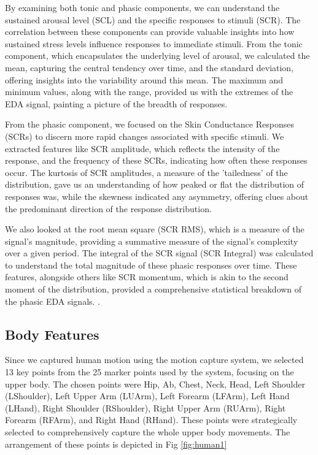 By examining both tonic and phasic components, we can understand the sustained arousal level (SCL) and the specific responses to stimuli (SCR). The correlation between these components can provide valuable insights into how sustained stress levels influence responses to immediate stimuli.
From the tonic component, which encapsulates the underlying level of arousal, we calculated the mean, capturing the central tendency over time, and the standard deviation, offering insights into the variability around this mean. The maximum and minimum values, along with the range, provided us with the extremes of the EDA signal, painting a picture of the breadth of responses.

From the phasic component, we focused on the Skin Conductance Responses (SCRs) to discern more rapid changes associated with specific stimuli. We extracted features like SCR amplitude, which reflects the intensity of the response, and the frequency of these SCRs, indicating how often these responses occur. The kurtosis of SCR amplitudes, a measure of the 'tailedness' of the distribution, gave us an understanding of how peaked or flat the distribution of responses was, while the skewness indicated any asymmetry, offering clues about the predominant direction of the response distribution.

We also looked at the root mean square (SCR RMS), which is a measure of the signal's magnitude, providing a summative measure of the signal's complexity over a given period. The integral of the SCR signal (SCR Integral) was calculated to understand the total magnitude of these phasic responses over time. These features, alongside others like SCR momentum, which is akin to the second moment of the distribution, provided a comprehensive statistical breakdown of the phasic EDA signals.
.

\subsection{Body Features}
Since we captured human motion using the motion capture system, we selected 13 key points from the 25 marker points used by the system, focusing on the upper body. The chosen points were Hip, Ab, Chest, Neck, Head, Left Shoulder (LShoulder), Left Upper Arm (LUArm), Left Forearm (LFArm), Left Hand (LHand), Right Shoulder (RShoulder), Right Upper Arm (RUArm), Right Forearm (RFArm), and Right Hand (RHand). These points were strategically selected to comprehensively capture the whole upper body movements. The arrangement of these points is depicted in Fig \ref{fig:human1}



